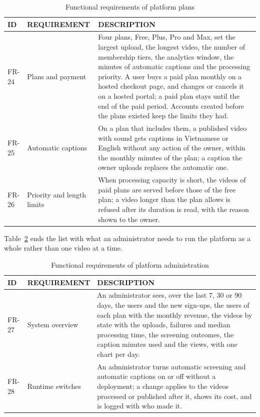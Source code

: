 \begin{table}[H]
\centering
\caption{Functional requirements of platform plans}
\label{tab:functional-requirements-plans}
\small
\begin{tabularx}{\textwidth}{p{} p{} X}
\toprule
\textbf{ID} & \textbf{REQUIREMENT} & \textbf{DESCRIPTION} \\
\midrule
FR-24 & Plans and payment & Four plans, Free, Plus, Pro and Max, set the largest upload, the longest video, the number of membership tiers, the analytics window, the minutes of automatic captions and the processing priority. A user buys a paid plan monthly on a hosted checkout page, and changes or cancels it on a hosted portal; a paid plan stays until the end of the paid period. Accounts created before the plans existed keep the limits they had. \\
FR-25 & Automatic captions & On a plan that includes them, a published video with sound gets captions in Vietnamese or English without any action of the owner, within the monthly minutes of the plan; a caption the owner uploads replaces the automatic one. \\
FR-26 & Priority and length limits & When processing capacity is short, the videos of paid plans are served before those of the free plan; a video longer than the plan allows is refused after its duration is read, with the reason shown to the owner. \\
\bottomrule
\end{tabularx}
\end{table}

Table~\ref{tab:functional-requirements-admin} ends the list with what an administrator needs to run
the platform as a whole rather than one video at a time.

\begin{table}[H]
\centering
\caption{Functional requirements of platform administration}
\label{tab:functional-requirements-admin}
\small
\begin{tabularx}{\textwidth}{p{} p{} X}
\toprule
\textbf{ID} & \textbf{REQUIREMENT} & \textbf{DESCRIPTION} \\
\midrule
FR-27 & System overview & An administrator sees, over the last 7, 30 or 90 days, the users and the new sign-ups, the users of each plan with the monthly revenue, the videos by state with the uploads, failures and median processing time, the screening outcomes, the caption minutes used and the views, with one chart per day. \\
FR-28 & Runtime switches & An administrator turns automatic screening and automatic captions on or off without a deployment; a change applies to the videos processed or published after it, shows its cost, and is logged with who made it. \\
\bottomrule
\end{tabularx}
\end{table}

